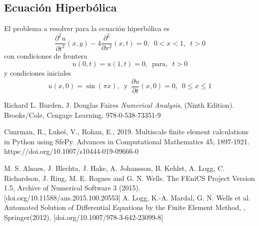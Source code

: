 \documentclass[a4paper]{article}
\begin{document}
\subsection{Ecuación Hiperbólica}
El problema a resolver para la ecuación hiperbólica es 
\begin{equation}
\frac{\partial^2 u}{\partial t^2}(x,y)-4\frac{\partial ^2}{\partial x^2}(x,t)=0,\,\,\,0<x<1,\,\,\,t>0
\end{equation}
con condiciones de frontera 
\begin{equation}
u(0,t)=u(1,t)=0,\,\,\, \text{para, }\,\,t>0
\end{equation}
y condiciones iniciales
\begin{equation}
u(x,0)=\sin(\pi x), \,\,\, \text{y}\,\,\,\frac{\partial u}{\partial t}(x,0)=0,\,\,\, 0\leq x \leq 1
\end{equation}



\begin{thebibliography}{99}


 Richard L. Burden, J. Douglas Faires \textit{Numerical Analysis}, (Ninth Edition). Brooks/Cole, Cengage Learning. 978-0-538-73351-9

 Cimrman, R., Lukeš, V., Rohan, E., 2019. Multiscale finite element calculations in Python using SfePy. Advances in Computational Mathematics 45, 1897-1921. https://doi.org/10.1007/s10444-019-09666-0

M. S. Alnaes, J. Blechta, J. Hake, A. Johansson, B. Kehlet, A. Logg, C. Richardson, J. Ring, M. E. Rognes and G. N. Wells. The FEniCS Project Version 1.5, Archive of Numerical Software 3 (2015). [doi.org/10.11588/ans.2015.100.20553]
\bibitem{}A. Logg, K.-A. Mardal, G. N. Wells et al. Automated Solution of Differential Equations by the Finite Element Method, , Springer(2012). [doi.org/10.1007/978-3-642-23099-8]





\end{thebibliography}
\end{document}
